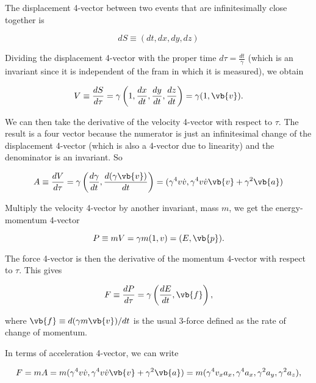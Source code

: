 \documentclass[english,a4paper,12pt]{report}
\begin{document}
The displacement 4-vector between two events that are infinitesimally close together is 

\begin{equation}
    dS \equiv (dt,dx,dy,dz)
\end{equation}

Dividing the displacement 4-vector with the proper time \(d \tau = \frac{dt}{\gamma } \) (which is an invariant since it is independent of the fram in which it is measured), we obtain 

\begin{equation}
    V \equiv  \frac{dS}{d\tau } = \gamma \left(1, \frac{dx}{dt}, \frac{dy}{dt}, \frac{dz}{dt}\right) = \gamma (1, \vb{v} ).
\end{equation}

We can then take the derivative of the velocity 4-vector with respect to \(\tau \). The result is a four vector because the numerator is just an infinitesimal change of the displacement 4-vector (which is also a 4-vector due to linearity) and the denominator is an invariant. So

\begin{equation}
    A \equiv  \frac{dV}{d\tau } = \gamma \left(\frac{d\gamma }{dt}, \frac{d(\gamma \vb{v} )}{dt}\right) = (\gamma ^{4}v \dot{v} , \gamma ^{4} v \dot{v} \vb{v} + \gamma ^2 \vb{a})
\end{equation}

Multiply the velocity 4-vector by another invariant, mass \(m\), we get the energy-momentum 4-vector

\begin{equation}
    P \equiv mV = \gamma m(1,v) = (E, \vb{p} ). 
\end{equation}

The force 4-vector is then the derivative of the momentum 4-vector with respect to \(\tau \). This gives

\begin{equation}
    F \equiv \frac{dP}{d\tau } = \gamma \left(\frac{dE}{dt}, \vb{f}\right),
\end{equation}

where \(\vb{f} \equiv d(\gamma m\vb{v} )/dt \) is the usual 3-force defined as the rate of change of momentum.  

In terms of acceleration 4-vector, we can write 

\begin{equation}
    F = mA = m(\gamma ^{4}v \dot{v} , \gamma ^{4} v \dot{v} \vb{v}  + \gamma ^2 \vb{a}  ) = m(\gamma ^{4} v_{x} a_{x}, \gamma ^{4} a_{x}, \gamma ^2 a_{y}, \gamma ^2 a_{z}),
\end{equation}
\end{document}
